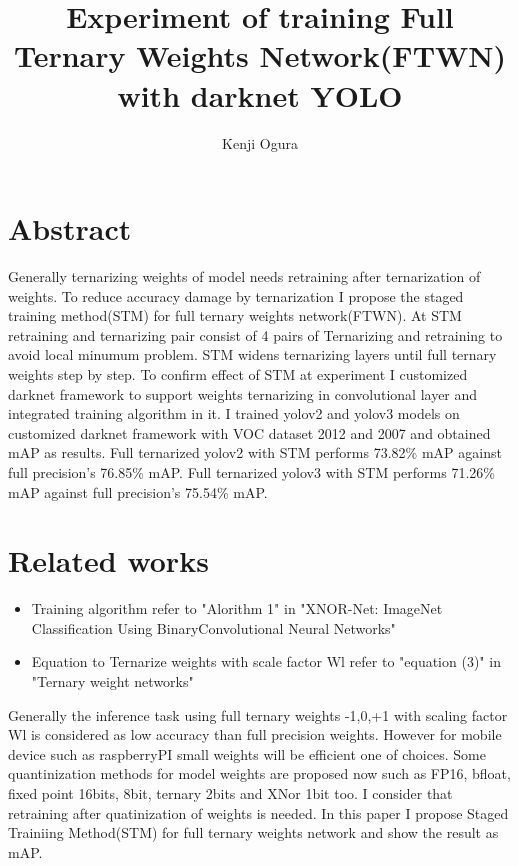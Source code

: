\documentclass[10pt,a4paper,twocolumn]{article}
\begin{document}
\title{Experiment of training Full Ternary Weights Network(FTWN) with darknet YOLO}
\author{Kenji Ogura}
\date{}
\maketitle

\section{Abstract}
Generally ternarizing weights of model needs retraining after ternarization of weights.
To reduce accuracy damage by ternarization I propose the staged training method(STM) for full ternary weights network(FTWN).
At STM retraining and ternarizing pair consist of 4 pairs of Ternarizing and retraining to avoid local minumum problem.
STM widens ternarizing layers until full ternary weights step by step.
To confirm effect of STM at experiment I customized darknet framework to support weights ternarizing in convolutional layer and integrated training algorithm in it.
I trained yolov2 and yolov3 models on customized darknet framework with VOC dataset 2012 and 2007 and obtained mAP as results.
Full ternarized yolov2 with STM performs 73.82\% mAP against full precision's 76.85\% mAP.
Full ternarized yolov3 with STM performs 71.26\% mAP against full precision's 75.54\% mAP.

\section{Related works}

\begin{itemize}
\item
 Training algorithm refer to "Alorithm 1" in "XNOR-Net: ImageNet Classification Using BinaryConvolutional Neural Networks"\cite{Rastegari2015XNORNetIC}
\item
 Equation to Ternarize weights with scale factor Wl refer to "equation (3)" in "Ternary weight networks"\cite{Li2016TernaryWN}
\end{itemize}

Generally the inference task using full ternary weights -1,0,+1 with scaling factor Wl is considered as low accuracy than full precision weights.
However for mobile device such as raspberryPI small weights will be efficient one of choices.
Some quantinization methods for model weights are proposed now such as FP16, bfloat, fixed point 16bits, 8bit, ternary 2bits and XNor 1bit too.
I consider that retraining after quatinization of weights is needed.
In this paper I propose Staged Trainiing Method(STM) for full ternary weights network and show the result as mAP.
\end{document}
